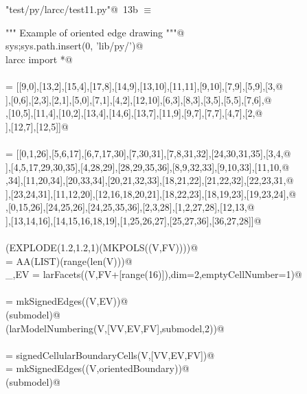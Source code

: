 \documentclass[11pt,oneside]{article}	%
\begin{document}
\begin{flushleft} \small \label{scrap25}
\protect{}\verb@"test/py/larcc/test11.py"@\nobreak\ {\footnotesize 13b }$\equiv$
\vspace{-1ex}
\begin{list}{}{} \item
\mbox{}\verb@""" Example of oriented edge drawing """@\\
\mbox{}\verb@import sys;sys.path.insert(0, 'lib/py/')@\\
\mbox{}\verb@from larcc import *@\\
\mbox{}\verb@@\\
\mbox{}\verb@V = [[9,0],[13,2],[15,4],[17,8],[14,9],[13,10],[11,11],[9,10],[7,9],[5,9],[3,@\\
\mbox{}],[0,6],[2,3],[2,1],[5,0],[7,1],[4,2],[12,10],[6,3],[8,3],[3,5],[5,5],[7,6],@\\
\mbox{}\verb@[8,5],[10,5],[11,4],[10,2],[13,4],[14,6],[13,7],[11,9],[9,7],[7,7],[4,7],[2,@\\
\mbox{}],[12,7],[12,5]]@\\
\mbox{}\verb@@\\
\mbox{}\verb@FV = [[0,1,26],[5,6,17],[6,7,17,30],[7,30,31],[7,8,31,32],[24,30,31,35],[3,4,@\\
\mbox{}],[4,5,17,29,30,35],[4,28,29],[28,29,35,36],[8,9,32,33],[9,10,33],[11,10,@\\
\mbox{},34],[11,20,34],[20,33,34],[20,21,32,33],[18,21,22],[21,22,32],[22,23,31,@\\
\mbox{}],[23,24,31],[11,12,20],[12,16,18,20,21],[18,22,23],[18,19,23],[19,23,24],@\\
\mbox{}\verb@[15,19,24,26],[0,15,26],[24,25,26],[24,25,35,36],[2,3,28],[1,2,27,28],[12,13,@\\
\mbox{}],[13,14,16],[14,15,16,18,19],[1,25,26,27],[25,27,36],[36,27,28]]@\\
\mbox{}\verb@@\\
\mbox{}\verb@VIEW(EXPLODE(1.2,1.2,1)(MKPOLS((V,FV))))@\\
\mbox{}\verb@VV = AA(LIST)(range(len(V)))@\\
\mbox{}\verb@_,EV = larFacets((V,FV+[range(16)]),dim=2,emptyCellNumber=1)@\\
\mbox{}\verb@@\\
\mbox{}\verb@submodel = mkSignedEdges((V,EV))@\\
\mbox{}\verb@VIEW(submodel)@\\
\mbox{}\verb@VIEW(larModelNumbering(V,[VV,EV,FV],submodel,2))@\\
\mbox{}\verb@@\\
\mbox{}\verb@orientedBoundary = signedCellularBoundaryCells(V,[VV,EV,FV])@\\
\mbox{}\verb@submodel = mkSignedEdges((V,orientedBoundary))@\\
\mbox{}\verb@VIEW(submodel)@\\
\mbox{}\verb@@{\NWsep}
\end{list}
\vspace{-2ex}
\end{flushleft}
\end{document}
